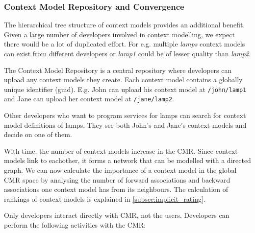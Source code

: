\subsubsection{Context Model Repository and Convergence}

The hierarchical tree structure of context models provides an additional benefit. Given a large number of developers involved in context modelling, we expect there would be a lot of duplicated effort. For e.g. multiple \emph{lamps} context models can exist from different developers or \emph{lamp1} could be of lesser quality than \emph{lamp2}.

The Context Model Repository is a central repository where developers can upload any context models they create. Each context model contains a globally unique identifier (guid). E.g. John can upload his context model at \texttt{/john/lamp1} and Jane can upload her context model at \texttt{/jane/lamp2}.

Other developers who want to program services for lamps can search for context model definitions of lamps. They see both John's and Jane's context models and decide on one of them.

With time, the number of context models increase in the CMR. Since context models link to eachother, it forms a network that can be modelled with a directed graph. We can now calculate the importance of a context model in the global CMR space by analysing the number of forward associations and backward associations one context model has from its neighbours. The calculation of rankings of context models is explained in \ref{subsec:implicit_rating}.

Only developers interact directly with CMR, not the users. Developers can perform the following activities with the CMR:

